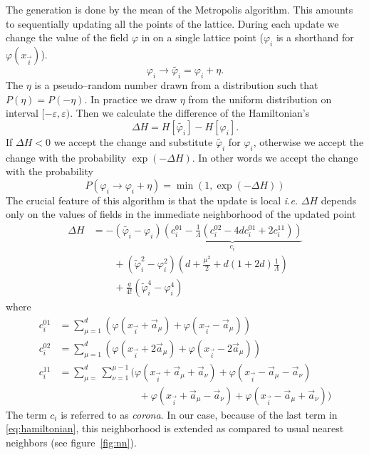 \documentclass[a4paper]{llncs}
\renewcommand{\a}[1]{\v{a}_{#1}}
\renewcommand{\v}[1]{\vec{#1}}
\newcommand{\vphi}{\varphi}
\newcommand{\vi}{{\vec{i}}}
\begin{document}
The  generation is done by the mean of the Metropolis
algorithm\cite{metropolis}. This amounts to sequentially updating all the points of the
lattice. During each update we change the value of the field $\vphi$
in on a single lattice point ($\vphi_i$ is a shorthand for $\vphi(x_\vi)$).
\begin{equation}
\vphi_i\longrightarrow\widetilde{\vphi_i}=\vphi_i+\eta.
\end{equation}
The $\eta$ is a pseudo--random number drawn from a distribution such
that $P(\eta) = P(-\eta)$. In practice we draw  $\eta$ from the
uniform distribution on interval $[-\varepsilon,\varepsilon)$.  Then we
calculate the difference of the Hamiltonian's
\begin{equation}
\Delta H=H[\widetilde{\vphi_i}]-H[\vphi_i].
\end{equation}
If $\Delta H < 0$ we accept the change and substitute
$\widetilde{\vphi_i}$ for $\vphi_i$, otherwise we accept the change
with the probability $\exp(-\Delta H)$. In other words we accept the
change with the probability
\begin{equation}
P(\vphi_i\rightarrow\vphi_i+\eta)=\min\left(1,\exp(-\Delta H)\right)
\end{equation}
The crucial feature of this algorithm is that the update is local {\em
  i.e.} $\Delta H$ depends only on the values of fields in the
immediate neighborhood of the updated point 
\begin{equation}
\begin{split}
\Delta H & = -(\widetilde{\vphi_i}-\vphi_i)
\underbrace{\left(c^{01}_i-\frac{1}{\Lambda}(c^{02}_i-4 d c^{01}_i+2 c^{11}_i )\right)}_{c_i}\\ 
&\phantom{= -}
+(\widetilde{\vphi}^2_i-\vphi_i^2)\left(d+\frac{\mu^2}{2}+d (1+2d)\frac{1}{\Lambda}\right)\\
&\phantom{= -}+\frac{g}{4!}\left(\widetilde{\vphi}^4_i-\vphi^4_i\right)
\end{split}
\end{equation}
where
\begin{equation}\begin{split} 
c_i^{01}&=\sum_{\mu=1}^d\left(\vphi(x_\vi+\a\mu)+\vphi(x_\vi-\a\mu)\right)\\
c_i^{02}&=\sum_{\mu=1}^d\left(\vphi(x_\vi+2\a\mu)+\vphi(x_\vi-2\a\mu)\right)\\
c_i^{11}&=\sum_{\mu=}^d\sum_{\nu=1}^{\mu-1}
\bigl(\vphi(x_\vi+\a\mu+\a\nu)+\vphi(x_\vi-\a\mu-\a\nu)\\
&\phantom{+=\sum_{\mu=}^d\sum_{\nu=1}^{\mu-1}
}
+ \vphi(x_\vi+\a\mu-\a\nu)+\vphi(x_\vi-\a\mu+\a\nu)
\bigr)
\end{split}
\end{equation}
The term $c_i$ is referred to as {\em corona}. 
In our case, because of
the last term in \eqref{eq:hamiltonian}, this neighborhood is
extended as compared to usual nearest neighbors (see figure~\ref{fig:nn}). 
\end{document}
